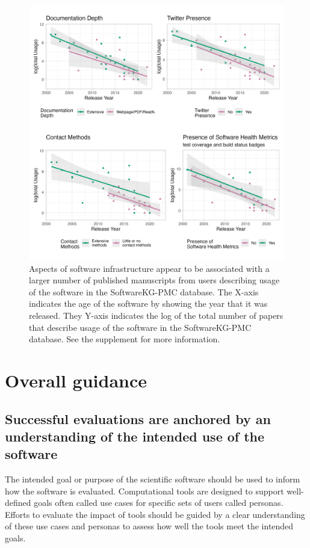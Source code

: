 \documentclass{article}
\begin{document}
\begin{figure}[H]
    \centering
\includegraphics[width=\textwidth,height=\textheight,keepaspectratio]{images/logUsage_stratified_2x2.png}
    \caption{Aspects of software infrastructure appear to be associated with a larger number of published manuscripts from users describing usage of the software in the SoftwareKG-PMC database. The X-axis indicates the age of the software by showing the year that it was released. They Y-axis indicates the log of the total number of papers that describe usage of the software in the SoftwareKG-PMC database. See the supplement for more information.}
    \label{fig:inf_cit}
\end{figure}



\section{Overall guidance}





\subsection{Successful evaluations are anchored by an understanding of the intended use of the software}
\label{sec:use_understanding}
The intended goal or purpose of the scientific software should be used to inform how the software is evaluated. Computational tools are designed to support well-defined goals often called use cases \cite{gamma_design_1995} for specific sets of users called personas\cite{cooper_inmates_2004}. Efforts to evaluate the impact of tools should be guided by a clear understanding of these use cases and personas to assess how well the tools meet the intended goals.  
\end{document}
